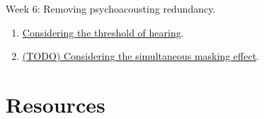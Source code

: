 Week 6: Removing psychoacousting redundancy.
\begin{enumerate}
\item \href{https://tecnologias-multimedia.github.io/study_guide/14-threshold_of_hearing/}{Considering the threshold of hearing}.
\item \href{https://tecnologias-multimedia.github.io/study_guide/15-simultaneous_masking/}{(TODO) Considering the simultaneous masking effect}.
\end{enumerate}

\section{Resources}


